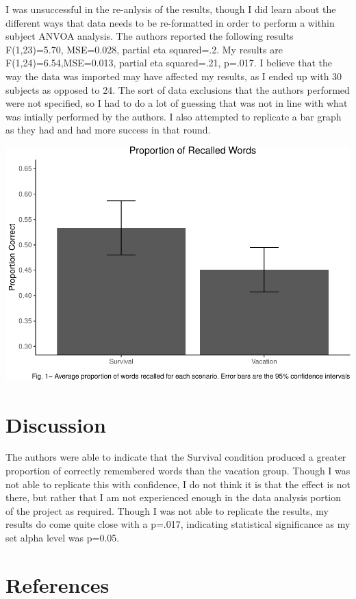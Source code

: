\documentclass[man]{apa6}
\begin{document}
I was unsuccessful in the re-anlysis of the results, though I did learn about the different ways that data needs to be re-formatted in order to perform a within subject ANVOA analysis. The authors reported the following results F(1,23)=5.70, MSE=0.028, partial eta squared=.2. My results are F(1,24)=6.54,MSE=0.013, partial eta squared=.21, p=.017. I believe that the way the data was imported may have affected my results, as I ended up with 30 subjects as opposed to 24. The sort of data exclusions that the authors performed were not specified, so I had to do a lot of guessing that was not in line with what was intially performed by the authors. I also attempted to replicate a bar graph as they had and had more success in that round.

\includegraphics{Midterm_Project_files/figure-latex/unnamed-chunk-2-1.pdf}

\hypertarget{discussion}{%
\section{Discussion}\label{discussion}}

The authors were able to indicate that the Survival condition produced a greater proportion of correctly remembered words than the vacation group. Though I was not able to replicate this with confidence, I do not think it is that the effect is not there, but rather that I am not experienced enough in the data analysis portion of the project as required. Though I was not able to replicate the results, my results do come quite close with a p=.017, indicating statistical significance as my set alpha level was p=0.05.
\newpage

\hypertarget{references}{%
\section{References}\label{references}}
\end{document}
